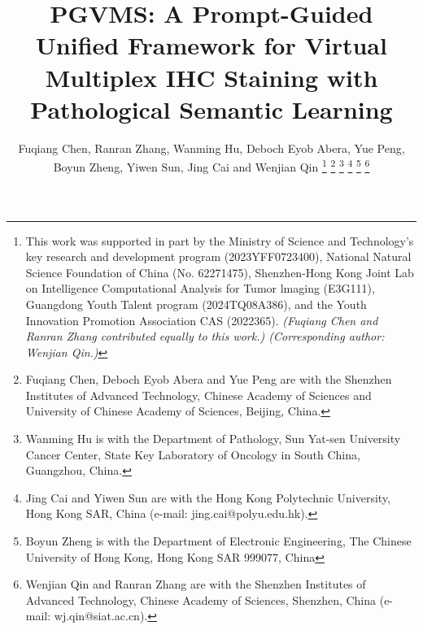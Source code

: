 \documentclass[journal,twoside,web]{ieeecolor}
\begin{document}
\title{PGVMS: A Prompt-Guided Unified Framework for Virtual Multiplex IHC Staining with Pathological Semantic Learning}
\author{Fuqiang Chen,  Ranran Zhang, Wanming Hu, Deboch Eyob Abera, Yue Peng, Boyun Zheng, Yiwen Sun, Jing Cai and Wenjian Qin 
\thanks{
This work was supported in part by the Ministry of Science and Technology’s key research and development program (2023YFF0723400),  National Natural Science Foundation of China (No. 62271475), Shenzhen-Hong Kong Joint Lab on Intelligence Computational Analysis for Tumor lmaging (E3G111), Guangdong Youth Talent program (2024TQ08A386), and the Youth Innovation Promotion Association CAS (2022365). \textit{(Fuqiang Chen and Ranran Zhang contributed equally to this work.) (Corresponding author: Wenjian Qin.)}}
\thanks{Fuqiang Chen, Deboch Eyob Abera and Yue Peng are with the Shenzhen Institutes of Advanced Technology, Chinese Academy of Sciences and University of Chinese Academy of Sciences, Beijing, China.}
\thanks{Wanming Hu is with the Department of Pathology, Sun Yat-sen University Cancer Center, State Key Laboratory of Oncology in South China, Guangzhou, China.}%
\thanks{Jing Cai and Yiwen Sun are with the Hong Kong Polytechnic University, Hong Kong SAR, China (e-mail: jing.cai@polyu.edu.hk).}
\thanks{Boyun Zheng is with the Department of Electronic Engineering, The Chinese University of Hong Kong, Hong Kong SAR 999077, China}
\thanks{Wenjian Qin and Ranran Zhang are with the Shenzhen Institutes of Advanced Technology, Chinese Academy of Sciences, Shenzhen, China (e-mail: wj.qin@siat.ac.cn).}}
\end{document}
